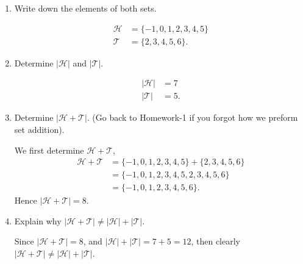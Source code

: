 \documentclass[12pt]{article} %
\begin{document}
\begin{qstn}
  \begin{enumerate}[label=(\alph*)]
    \item Write down the elements of both sets.
      \begin{solution}
        \begin{align*}
          \mathcal{H} &= \{-1,0,1,2,3,4,5\}\\
          \mathcal{T} &= \{2,3,4,5,6\} 
        .\end{align*}
      \end{solution}
    \item Determine $|\mathcal{H}|$ and $|\mathcal{T}|$.
      \begin{solution}
        \begin{align*}
          \left|\mathcal{H}\right| &= 7\\
          \left|\mathcal{T}\right| &= 5
        .\end{align*}
      \end{solution}
    \item Determine $|\mathcal{H + T}|$. (Go back to Homework-1 if you forgot how we preform set addition).
      \begin{solution}
        We first determine $\mathcal{H} + \mathcal{T}$,
        \begin{align*}
          \mathcal{H} + \mathcal{T} &= \{-1,0,1,2,3,4,5\} + \{2,3,4,5,6\} \\
                                    &= \{-1,0,1,2,3,4,5,2,3,4,5,6\} \tag{Merge Step}\\
                                    &= \{-1,0,1,2,3,4,5,6\} \tag{Remove duplicates}
        .\end{align*}
        Hence $\left|\mathcal{H} + \mathcal{T}\right| = 8$.
      \end{solution}
    \item Explain why $|\mathcal{H + T}| \neq |\mathcal{H}| + |\mathcal{T}|$.
      \begin{solution}
        Since $ \left|\mathcal{H} + \mathcal{T}\right| = 8$, and $\left|\mathcal{H}\right| + \left|\mathcal{T}\right| = 7 + 5 =
        12$, then clearly $|\mathcal{H + T}| \neq |\mathcal{H}| + |\mathcal{T}|$.
      \end{solution}
  \end{enumerate}
\end{qstn}

\newpage
\end{document}
